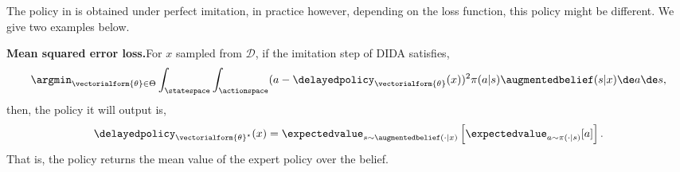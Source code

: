 The policy in  is obtained under perfect imitation, in practice however, depending on the loss function, this policy might be different. We give two examples below.

\noindent\textbf{Mean squared error loss.}\indent For $x$ sampled from $\mathcal{D}$, if the imitation step of DIDA satisfies,
\begin{align*}
    \argmin_{\vectorialform{\theta}\in\Theta} \int_{\statespace}\int_{\actionspace} (a-\delayedpolicy_{\vectorialform{\theta}}(x))^2 \pi(a\vert s) \augmentedbelief(s\vert x)\de a\de s,
\end{align*}
then, the policy it will output is,
\begin{align*}
    \delayedpolicy_{\vectorialform{\theta}^\star}(x) = \expectedvalue_{s\sim \augmentedbelief(\cdot\vert x)}\left[ \expectedvalue_{a \sim\pi(\cdot \vert s)}[a]\right].
\end{align*}
That is, the policy returns the mean value of the expert policy over the belief. 

